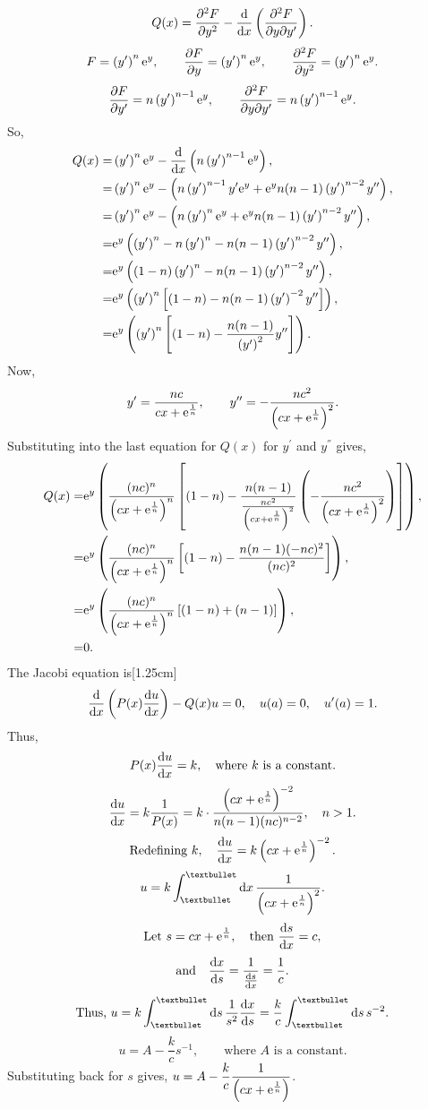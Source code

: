 \[
	Q(x) = \frac{\partial ^2F}{\partial y^2} - \frac{\mathrm{d}}{\mathrm{d}x}\left(\frac{\partial ^2F}{\partial y\partial y^\prime}\right).
\]
\[
	F = \left(y^\prime\right)^n\mathrm{e}^y,\qquad \frac{\partial F}{\partial y}=\left(y^\prime\right)^n\mathrm{e}^y,\qquad \frac{\partial ^2F}{\partial y^2}=\left(y^\prime\right)^n\mathrm{e}^y.
\]
\[
	\frac{\partial F}{\partial y^\prime} = n\left(y^\prime\right)^{n-1}\mathrm{e}^y,\qquad \frac{\partial ^2F}{\partial y\partial y^\prime} = n\left(y^\prime\right)^{n-1}\mathrm{e}^y.
\]
So,
\begin{align*}
	Q(x) =& \left(y^\prime\right)^n\mathrm{e}^y - \frac{\mathrm{d}}{\mathrm{d}x}\left(n\left(y^\prime\right)^{n-1}\mathrm{e}^y\right),\\
	=& \left(y^\prime\right)^n\mathrm{e}^y - \left(n\left(y^\prime\right)^{n-1}y^\prime\mathrm{e}^y +\mathrm{e}^yn(n-1)\left(y^\prime\right)^{n-2}y^{\prime\prime}\right),\\
	=& \left(y^\prime\right)^n\mathrm{e}^y - \left(n\left(y^\prime\right)^{n}\mathrm{e}^y +\mathrm{e}^yn(n-1)\left(y^\prime\right)^{n-2}y^{\prime\prime}\right),\\
	=& \mathrm{e}^y\left(\left(y^\prime\right)^n - n\left(y^\prime\right)^{n} - n(n-1)\left(y^\prime\right)^{n-2}y^{\prime\prime}\right),\\
	=& \mathrm{e}^y\left((1-n)\left(y^\prime\right)^n - n(n-1)\left(y^\prime\right)^{n-2}y^{\prime\prime}\right),\\
	=& \mathrm{e}^y\left(\left(y^\prime\right)^n\left[(1-n)-n(n-1)\left(y^\prime\right)^{-2}y^{\prime\prime}\right]\right),\\
	=& \mathrm{e}^y\left(\left(y^\prime\right)^n\left[(1-n)-\frac{n(n-1)}{\left(y^\prime\right)^{2}}y^{\prime\prime}\right]\right).
\end{align*}
Now,
\[
	y^\prime = \frac{nc}{cx + \mathrm{e}^{\frac{1}{n}}},\qquad y^{\prime\prime} = -\frac{nc^2}{\left(cx + \mathrm{e}^{\frac{1}{n}}\right)^2}.
\]
Substituting into the last equation for $Q(x)$ for $y^\prime$ and $y^\dprime$ gives,
\begin{align*}
	Q(x) =& \mathrm{e}^y\left(\frac{(nc)^n}{\left(cx + \mathrm{e}^{\frac{1}{n}}\right)^n}\left[(1-n)-\frac{n(n-1)}{\frac{nc^2}{\left(cx + \mathrm{e}^{\frac{1}{n}}\right)^2}}\left(-\frac{nc^2}{\left(cx + \mathrm{e}^{\frac{1}{n}}\right)^2}\right)\right]\right),\\
	=& \mathrm{e}^y\left(\frac{(nc)^n}{\left(cx + \mathrm{e}^{\frac{1}{n}}\right)^n}\left[
			(1-n)-\frac{n(n-1)(-nc)^2}{(nc)^2}
	\right]\right),\\
	=& \mathrm{e}^y\left(
			\frac{(nc)^n}{\left(cx + \mathrm{e}^{\frac{1}{n}}\right)^n}\left[
				(1-n) + (n-1)
			\right]
	\right),\\
	=& 0.
\end{align*}
The Jacobi equation is[1.25cm]
\[
	\frac{\mathrm{d}}{\mathrm{d}x}\left(
		P(x)\frac{\mathrm{d}u}{\mathrm{d}x}
	\right) - Q(x)u = 0,\quad	u(a) = 0,\quad u^\prime(a) = 1.
\]
Thus,
\[
	P(x)\frac{\mathrm{d}u}{\mathrm{d}x} = k,\quad \textrm{where $k$ is a constant.}
\]
\[
	\frac{\mathrm{d}u}{\mathrm{d}x} =k\frac{1}{P(x)} = k\cdot\frac{\left(cx+\mathrm{e}^{\frac{1}{n}}\right)^{-2}}{n(n-1)(nc)^{n-2}},\quad n>1.
\]
\[
	\textrm{Redefining } k,\quad \frac{\mathrm{d}u}{\mathrm{d}x} = k\left(cx + \mathrm{e}^{\frac{1}{n}}\right)^{-2}.
\]
\[
	u = k\Int{•}{•}{x}\frac{1}{\lr{cx + \e^{\frac{1}{n}}}^2}.
\]
\[
	\textrm{Let } s = cx + \mathrm{e}^{\frac{1}{n}},\quad \textrm{then } \frac{\mathrm{d}s}{\mathrm{d}x} = c,
\]
\[
	\textrm{and}\quad \frac{\mathrm{d}x}{\mathrm{d}s} = \dfrac{1}{\frac{\mathrm{d}s}{\mathrm{d}x}} = \frac{1}{c}.
\]
\[
\textrm{Thus, } u=k\Int{•}{•}{s} \frac{1}{s^2}\deriv{x}{s} = \frac{k}{c}\Int{•}{•}{s}s^{-2}.
\]
\[
	u = A - \frac{k}{c}s^{-1},\qquad\textrm{where $A$ is a constant.}
\]
Substituting back for $s$ gives, $u=A - \dfrac{k}{c}\dfrac{1}{\left(cx + \mathrm{e}^{\frac{1}{n}}\right)}$.

